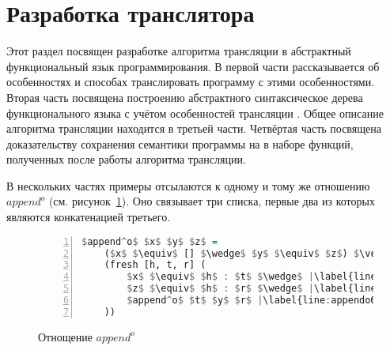 \section{Разработка транслятора}
\label{translator}

Этот раздел посвящен разработке алгоритма трансляции \miniKanren{} в абстрактный функциональный язык программирования.
В первой части рассказывается об особенностях \miniKanren{} и способах транслировать программу с этими особенностями.
Вторая часть посвящена построению абстрактного синтаксическое дерева функционального языка с учётом особенностей трансляции \miniKanren{}.
Общее описание алгоритма трансляции находится в третьей части.
Четвёртая часть посвящена доказательству сохранения семантики программы на \miniKanren{} в наборе функций, полученных после работы алгоритма трансляции.

В нескольких частях примеры отсылаются к одному и тому же отношению $append^o$ (см. рисунок~\ref{lst:appendo}).
Оно связывает три списка, первые два из которых являются конкатенацией третьего.

\begin{figure}[h!]
  \begin{center}
  \begin{minipage}{0.4\textwidth}
  \begin{lstlisting}[language=Haskell, frame=single, numbers=left,numberstyle=\small, firstnumber=1, escapechar=|]
  $append^o$ $x$ $y$ $z$ =
    ($x$ $\equiv$ [] $\wedge$ $y$ $\equiv$ $z$) $\vee$ |\label{line:appendo2}|
    (fresh [h, t, r] (
        $x$ $\equiv$ $h$ : $t$ $\wedge$ |\label{line:appendo4}|
        $z$ $\equiv$ $h$ : $r$ $\wedge$ |\label{line:appendo5}|
        $append^o$ $t$ $y$ $r$ |\label{line:appendo6}|
    ))
    \end{lstlisting}
  \end{minipage}
  \end{center}
  \caption{Отнощение $append^o$}
  \label{lst:appendo}
\end{figure}





